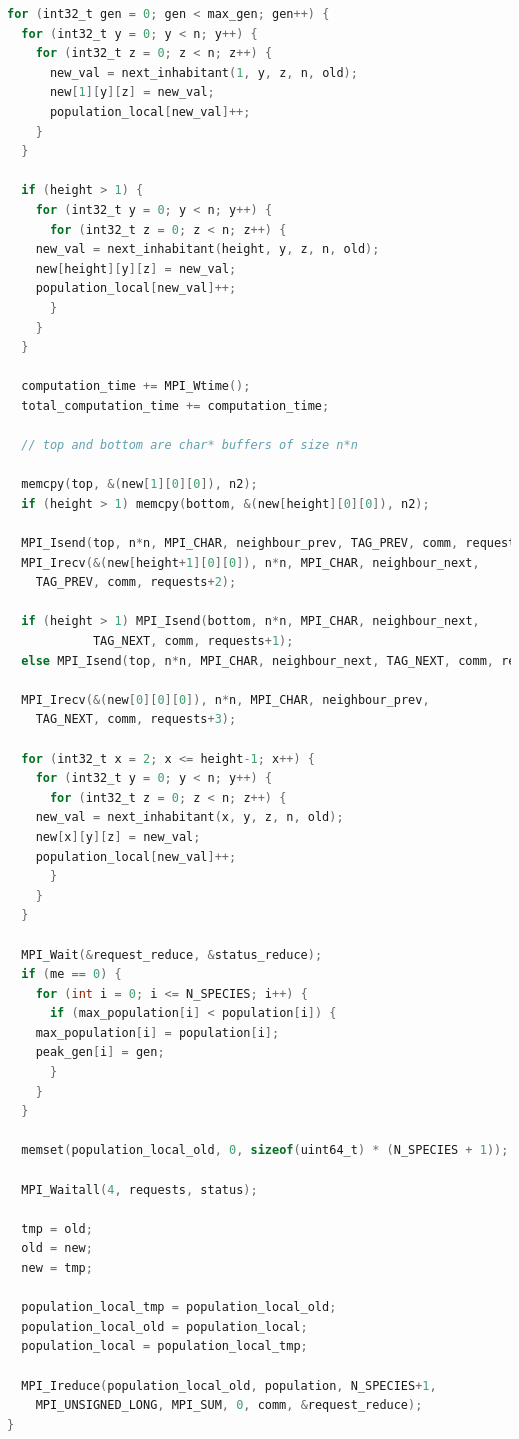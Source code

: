 \documentclass{article}
\begin{document}
\begin{lstlisting}[language=C,caption={Generation loop for background exchange of borders}]
for (int32_t gen = 0; gen < max_gen; gen++) {
  for (int32_t y = 0; y < n; y++) {
    for (int32_t z = 0; z < n; z++) {
      new_val = next_inhabitant(1, y, z, n, old);
      new[1][y][z] = new_val;
      population_local[new_val]++;
    }
  }

  if (height > 1) {
    for (int32_t y = 0; y < n; y++) {
      for (int32_t z = 0; z < n; z++) {
	new_val = next_inhabitant(height, y, z, n, old);
	new[height][y][z] = new_val;
	population_local[new_val]++;
      }
    }
  }

  computation_time += MPI_Wtime();
  total_computation_time += computation_time;

  // top and bottom are char* buffers of size n*n

  memcpy(top, &(new[1][0][0]), n2);
  if (height > 1) memcpy(bottom, &(new[height][0][0]), n2);

  MPI_Isend(top, n*n, MPI_CHAR, neighbour_prev, TAG_PREV, comm, requests);
  MPI_Irecv(&(new[height+1][0][0]), n*n, MPI_CHAR, neighbour_next,
    TAG_PREV, comm, requests+2);

  if (height > 1) MPI_Isend(bottom, n*n, MPI_CHAR, neighbour_next,
		    TAG_NEXT, comm, requests+1);
  else MPI_Isend(top, n*n, MPI_CHAR, neighbour_next, TAG_NEXT, comm, requests+1);

  MPI_Irecv(&(new[0][0][0]), n*n, MPI_CHAR, neighbour_prev,
    TAG_NEXT, comm, requests+3);

  for (int32_t x = 2; x <= height-1; x++) {
    for (int32_t y = 0; y < n; y++) {
      for (int32_t z = 0; z < n; z++) {
	new_val = next_inhabitant(x, y, z, n, old);
	new[x][y][z] = new_val;
	population_local[new_val]++;
      }
    }
  }

  MPI_Wait(&request_reduce, &status_reduce);
  if (me == 0) {
    for (int i = 0; i <= N_SPECIES; i++) {
      if (max_population[i] < population[i]) {
	max_population[i] = population[i];
	peak_gen[i] = gen;
      }
    }
  }

  memset(population_local_old, 0, sizeof(uint64_t) * (N_SPECIES + 1));

  MPI_Waitall(4, requests, status);

  tmp = old;
  old = new;
  new = tmp;

  population_local_tmp = population_local_old;
  population_local_old = population_local;
  population_local = population_local_tmp;

  MPI_Ireduce(population_local_old, population, N_SPECIES+1,
    MPI_UNSIGNED_LONG, MPI_SUM, 0, comm, &request_reduce);
}
\end{lstlisting}




% 

\end{document}
